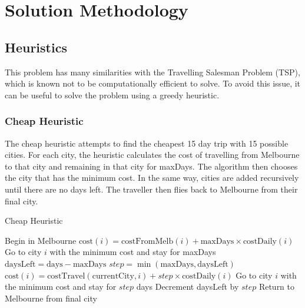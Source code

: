 \documentclass[12pt]{article}
\begin{document}
\pagebreak
\section{Solution Methodology} 
\label{sec:methods}


\subsection{Heuristics}

This problem has many similarities with the Travelling Salesman Problem (TSP), which is known not to be computationally efficient to solve. To avoid this issue, it can be useful to solve the problem using a greedy heuristic.

\subsubsection{Cheap Heuristic}

The cheap heuristic attempts to find the cheapest 15 day trip with 15 possible cities. For each city, the heuristic calculates the cost of travelling from Melbourne to that city and remaining in that city for maxDays. The algorithm then chooses the city that has the minimum cost. In the same way, cities are added recursively until there are no days left. The traveller then flies back to Melbourne from their final city.

\begin{algorithm}[ht!]
\caption{Cheap Heuristic}
\begin{algorithmic}
\STATE Begin in Melbourne
\STATE $\text{cost}(i) = \text{costFromMelb}(i) + \text{maxDays} \times \text{costDaily}(i)$
\ENDFOR
\STATE Go to city $i$ with the minimum cost and stay for maxDays
\STATE $\text{daysLeft} = \text{days} - \text{maxDays}$
\STATE $step = \min (\text{maxDays}, \text{daysLeft})$
\STATE $\text{cost}(i) = \text{costTravel}(\text{currentCity}, i) + step \times \text{costDaily}(i)$
\ENDFOR
\STATE Go to city $i$ with the minimum cost and stay for $step$ days
\STATE Decrement daysLeft by $step$
\ENDWHILE
\STATE Return to Melbourne from final city
\end{algorithmic}
\end{algorithm}
\end{document}
